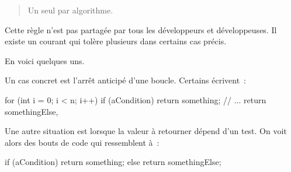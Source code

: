 	\begin{quote}
	\og{}Un seul  par algorithme\fg{}.
	\end{quote}

	Cette règle n’est pas partagée par tous les développeurs et développeuses.
	Il existe un courant qui tolère plusieurs 
	dans certains cas précis.

	En voici quelques uns.

	Un cas concret est l'arrêt anticipé d'une boucle.  Certains écrivent~:

	\begin{java}
for (int i = 0; i < n; i++){
	if (aCondition){
		return something;
	}
	// ...
	return somethingElse,
}
	\end{java}

	\bigskip
	
	Une autre situation est lorsque la valeur à retourner dépend d’un test.  On
	voit alors des bouts de code qui ressemblent à~:

	\begin{java}
if (aCondition){
	return something;
} else {
	return somethingElse;
}
	\end{java}

	
